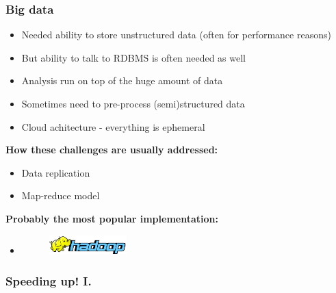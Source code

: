 \documentclass[10pt,utf8]{beamer}
\begin{document}
\begin{frame}
	\frametitle{Big data}
	\begin{itemize}
		\item Needed ability to store unstructured data (often for performance reasons)
		\item But ability  to talk to RDBMS is often needed as well
		\item Analysis run on top of the huge amount of data
		\item Sometimes need to pre-process (semi)structured data
		\item Cloud achitecture - everything is ephemeral
	\end{itemize}

	 {	
		\vspace{0.5cm}
		\textbf{How these challenges are usually addressed:}
			\begin{itemize}
			\item Data replication
			\item Map-reduce model
		\end{itemize}
	}
	
	 {
		\vspace{0.5cm}
		\textbf{Probably the most popular implementation:}
		\begin{itemize}
			\item
				\begin{figure}
					\includegraphics[width=3cm, left]{./img/hadoop-logo.eps}
				\end{figure}	
		\end{itemize}
	}

\end{frame}

\begin{frame}
	\frametitle{Speeding up! I.}
	\vspace{0.5cm}
\end{frame}
\end{document}
